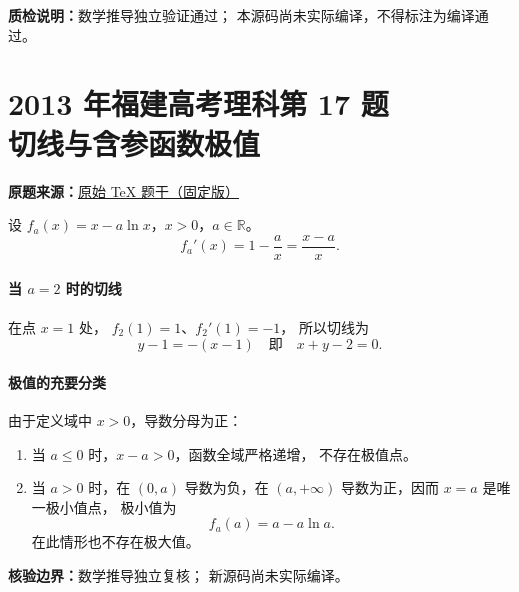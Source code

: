 \documentclass[UTF8,a4paper,11pt]{ctexart}
\begin{document}
\bigskip
\noindent\textbf{质检说明：}数学推导独立验证通过；
本源码尚未实际编译，不得标注为编译通过。

\clearpage
{}
{}
\section*{2013 年福建高考理科第 17 题\\切线与含参函数极值}
\noindent\textbf{原题来源：}\href{https://github.com/DxAThing/Gaokao-Math-Problems-Compilation/blob/f1ae169b58a75b3db6e35c670b3f0d5c78718188/content/2013/fujian_science.tex#L356}{原始 TeX 题干（固定版）}

设 $f_a(x)=x-a\ln x$，$x>0$，$a\in\mathbb R$。
\[
 f_a'(x)=1-\frac{a}{x}=\frac{x-a}{x}.
\]
\paragraph{当 $a=2$ 时的切线}
在点 $x=1$ 处，
$f_2(1)=1$、$f_2'(1)=-1$，
所以切线为
\[
 \boxed{y-1=-(x-1)}\quad\text{即}\quad x+y-2=0.
\]

\paragraph{极值的充要分类}
由于定义域中 $x>0$，导数分母为正：
\begin{enumerate}
\item 当 $a\le0$ 时，$x-a>0$，函数全域严格递增，
不存在极值点。
\item 当 $a>0$ 时，在 $(0,a)$ 导数为负，在
$(a,+\infty)$ 导数为正，因而 $x=a$ 是唯一极小值点，
极小值为
\[
 \boxed{f_a(a)=a-a\ln a}.
\]
在此情形也不存在极大值。
\end{enumerate}
\noindent\textbf{核验边界：}数学推导独立复核；
新源码尚未实际编译。
\end{document}
